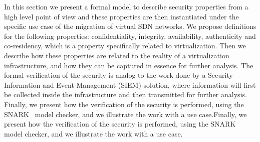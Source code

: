 In this section we present a formal model to describe security properties from a high level point of view and these properties are then instantiated under the specific use case of the migration of virtual SDN networks. We propose definitions for the following properties: confidentiality, integrity, availability, authenticity and co-residency, which is a property specifically related to virtualization. 
Then we describe how these properties are related to the reality of a virtualization infrastructure, and how they can be captured in essence for further analysis. The formal verification of the security is analog to the work done by a Security Information and Event Management (SIEM) solution, where information will first be collected inside the infrastructure and then transmitted for further analysis.
Finally, we present how the verification of the security is performed, using the SNARK~\cite{snark-Stickel2000} model checker, and we illustrate the work with a use case.Finally, we present how the verification of the security is performed, using the SNARK~\cite{snark-Stickel2000} model checker, and we illustrate the work with a use case.



